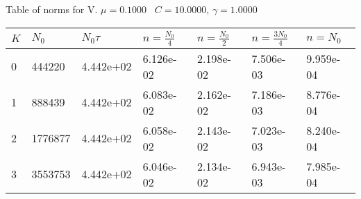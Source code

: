 \begin{center}
Table of norms for V. $\mu = 0.1000$ \, $C = 10.0000$, $\gamma = 1.0000$
  
\begin{tabular}{|p{0.8in}|p{0.8in}|p{0.8in}|p{0.8in}|p{0.8in}|p{0.8in}|p{0.8in}|} \hline
$K$ &$N_0$ &$N_0 \tau$ &$n = \frac{N_0}{4}$ &$n = \frac{N_0}{2}$ &$n = \frac{3N_0}{4}$ &$n = N_0$ \\ \hline 
0 &444220 &4.442e+02 &6.126e-02 &2.198e-02 &7.506e-03 &9.959e-04 \\ \hline 
1 &888439 &4.442e+02 &6.083e-02 &2.162e-02 &7.186e-03 &8.776e-04 \\ \hline 
2 &1776877 &4.442e+02 &6.058e-02 &2.143e-02 &7.023e-03 &8.240e-04 \\ \hline 
3 &3553753 &4.442e+02 &6.046e-02 &2.134e-02 &6.943e-03 &7.985e-04 \\ \hline 

\end{tabular}\\[20pt]
\end{center}
